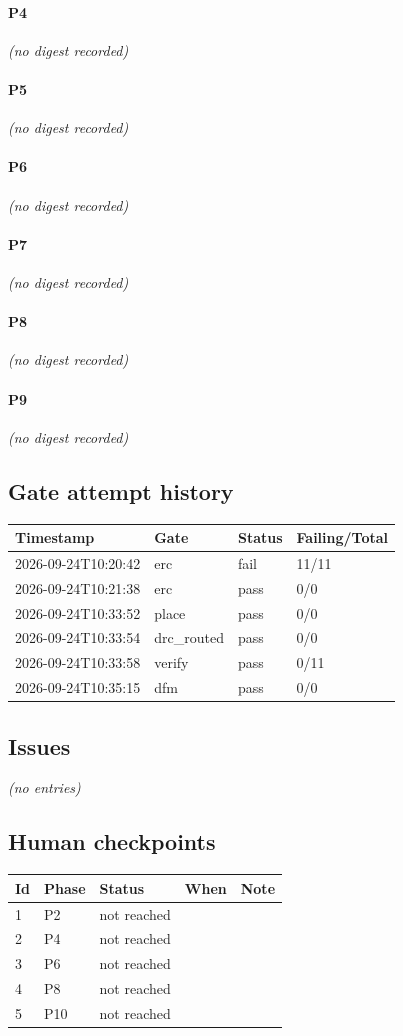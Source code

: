 \documentclass[11pt,a4paper]{article}
\begin{document}
\paragraph*{P4}
\emph{(no digest recorded)}
\paragraph*{P5}
\emph{(no digest recorded)}
\paragraph*{P6}
\emph{(no digest recorded)}
\paragraph*{P7}
\emph{(no digest recorded)}
\paragraph*{P8}
\emph{(no digest recorded)}
\paragraph*{P9}
\emph{(no digest recorded)}
\subsection*{Gate attempt history}
{\small
\begin{longtable}{llll}
\toprule
\textbf{Timestamp} & \textbf{Gate} & \textbf{Status} & \textbf{Failing/Total} \\
\midrule
\endhead
2026-09-24T10:20:42 & erc & fail & 11/11 \\
2026-09-24T10:21:38 & erc & pass & 0/0 \\
2026-09-24T10:33:52 & place & pass & 0/0 \\
2026-09-24T10:33:54 & drc\_routed & pass & 0/0 \\
2026-09-24T10:33:58 & verify & pass & 0/11 \\
2026-09-24T10:35:15 & dfm & pass & 0/0 \\
\bottomrule
\end{longtable}
}
\subsection*{Issues}
\emph{(no entries)}
\subsection*{Human checkpoints}
{\small
\begin{longtable}{lllp{2.6cm}p{6.4cm}}
\toprule
\textbf{Id} & \textbf{Phase} & \textbf{Status} & \textbf{When} & \textbf{Note} \\
\midrule
\endhead
1 & P2 & not reached &  &  \\
2 & P4 & not reached &  &  \\
3 & P6 & not reached &  &  \\
4 & P8 & not reached &  &  \\
5 & P10 & not reached &  &  \\
\bottomrule
\end{longtable}
}
\end{document}
